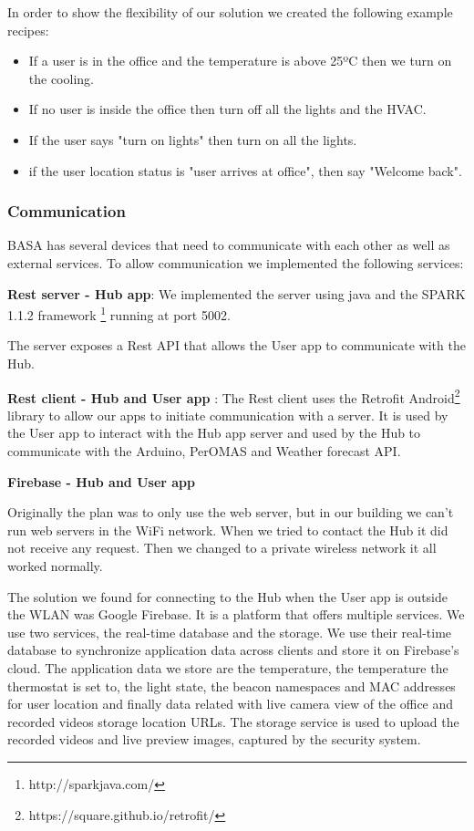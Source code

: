 \documentclass[conference]{IEEEtran}
\begin{document}
In order to show the flexibility of our solution we created the following example recipes:
\begin{itemize}
  \item If a user is in the office and the temperature is above 25ºC then we turn on the cooling.
  \item If no user is inside the office then turn off all the lights and the HVAC.
  \item If the user says "turn on lights" then turn on all the lights.
  \item if the user location status is "user arrives at office", then say "Welcome back".
 
\end{itemize}








\subsubsection{Communication}

BASA has several devices that need to communicate with each other as well as external services. To allow communication we implemented the following services:


\textbf{Rest server - Hub app}: We implemented the server using java and the SPARK 1.1.2 framework \footnote{http://sparkjava.com/} running at port 5002.

The server exposes a Rest API that allows the User app to communicate with the Hub.

\textbf{Rest client - Hub and User app }: The Rest client  uses the Retrofit Android\footnote{https://square.github.io/retrofit/}  library to allow our apps to initiate communication with a server. It is used by the User app to interact with the Hub app server and used by the Hub to communicate with the Arduino, PerOMAS and Weather forecast API.


\textbf{Firebase - Hub and User app}

Originally the plan was to only use the web server, but in our building we can't run web servers in the WiFi network. When we tried to contact the Hub it did not receive any request. Then we changed to a private wireless network it all worked normally.

The solution we found for connecting  to the Hub when the User app is outside the \ac{WLAN} was Google Firebase. It is a platform that offers multiple services. We use two services, the real-time database and the storage.
We use their real-time database to synchronize application data across clients and store it on Firebase's cloud. The application data we store are the temperature, the temperature the thermostat is set to, the light state, the beacon namespaces and MAC addresses for user location and finally data related with live camera view of the office and recorded videos storage location URLs. The storage service is used to upload the recorded videos and live preview images, captured by the security system.
\end{document}
